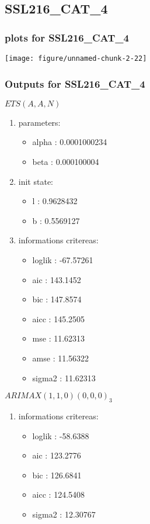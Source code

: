 \documentclass[10pt,a4paper]{article}\usepackage[]{graphicx}\usepackage[]{color}
\makeatletter
\def\maxwidth{ %
  \ifdim\Gin@nat@width>\linewidth
    \linewidth
  \else
    \Gin@nat@width
  \fi
}
\newcommand{\AaA}{\_}
\makeatother
\begin{document}
\newpage
\subsection{SSL216\AaA CAT\AaA 4}
\subsubsection{plots for SSL216\AaA CAT\AaA 4}

\texttt{[image: figure/unnamed-chunk-2-22]} 

\newpage
\subsubsection{Outputs for SSL216\AaA CAT\AaA 4}
\begin{multicols}{2}


$ ETS(A,A,N) $
\begin{enumerate}
\item parameters:
\begin{itemize}
\item  alpha :  0.0001000234 
\item  beta :  0.000100004 
\end{itemize}
\item init state:
\begin{itemize}
\item  l :  0.9628432 
\item  b :  0.5569127 
\end{itemize}
\item informations critereas:
\begin{itemize}
\item  loglik :  -67.57261 
\item  aic :  143.1452 
\item  bic :  147.8574 
\item  aicc :  145.2505 
\item  mse :  11.62313 
\item  amse :  11.56322 
\item  sigma2 :  11.62313 
\end{itemize}
\end{enumerate}

\columnbreak


 $ARIMAX(1,1,0)(0,0,0)_{3}$ 
\begin{enumerate}
\item informations critereas:
\begin{itemize}
\item  loglik :  -58.6388 
\item  aic :  123.2776 
\item  bic :  126.6841 
\item  aicc :  124.5408 
\item  sigma2 :  12.30767 
\end{itemize}


\end{enumerate}
\end{multicols}
\end{document}

